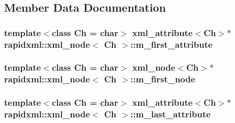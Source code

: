 \subsection{Member Data Documentation}
\hypertarget{singletonrapidxml_1_1xml__node_a5f7caf8d72d8fae634be6eb744ad8538}{
\subsubsection[{m\+\_\+first\+\_\+attribute}]{\setlength{\rightskip}{0pt plus 5cm}template$<$class Ch = char$>$ {\bf xml\+\_\+attribute}$<$Ch$>$$\ast$ {\bf rapidxml\+::xml\+\_\+node}$<$ Ch $>$\+::m\+\_\+first\+\_\+attribute\hspace{0.3cm}{\ttfamily [private]}}}\label{singletonrapidxml_1_1xml__node_a5f7caf8d72d8fae634be6eb744ad8538}
\hypertarget{singletonrapidxml_1_1xml__node_a3c2a0b286724865b5c000e3333f60d4a}{
\subsubsection[{m\+\_\+first\+\_\+node}]{\setlength{\rightskip}{0pt plus 5cm}template$<$class Ch = char$>$ {\bf xml\+\_\+node}$<$Ch$>$$\ast$ {\bf rapidxml\+::xml\+\_\+node}$<$ Ch $>$\+::m\+\_\+first\+\_\+node\hspace{0.3cm}{\ttfamily [private]}}}\label{singletonrapidxml_1_1xml__node_a3c2a0b286724865b5c000e3333f60d4a}
\hypertarget{singletonrapidxml_1_1xml__node_ad82c1bdd1a5c94927cf8a627f18953b9}{
\subsubsection[{m\+\_\+last\+\_\+attribute}]{\setlength{\rightskip}{0pt plus 5cm}template$<$class Ch = char$>$ {\bf xml\+\_\+attribute}$<$Ch$>$$\ast$ {\bf rapidxml\+::xml\+\_\+node}$<$ Ch $>$\+::m\+\_\+last\+\_\+attribute\hspace{0.3cm}{\ttfamily [private]}}}\label{singletonrapidxml_1_1xml__node_ad82c1bdd1a5c94927cf8a627f18953b9}
